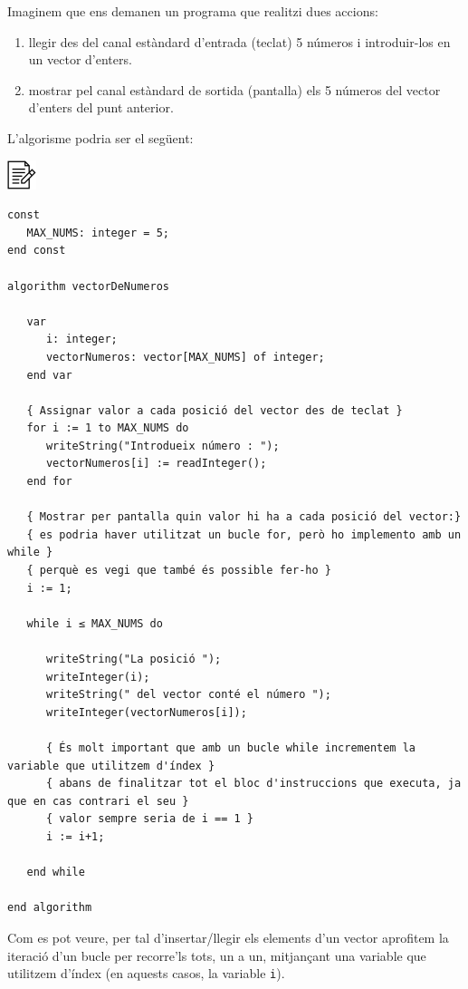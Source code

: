 \documentclass[]{book}
\providecommand{\tightlist}{%
  \setlength{\itemsep}{0pt}\setlength{\parskip}{0pt}}
\begin{document}
Imaginem que ens demanen un programa que realitzi dues accions:

\begin{enumerate}
\def\labelenumi{\arabic{enumi}.}
\tightlist
\item
  llegir des del canal estàndard d'entrada (teclat) 5 números i
  introduir-los en un vector d'enters.
\item
  mostrar pel canal estàndard de sortida (pantalla) els 5 números del
  vector d'enters del punt anterior.
\end{enumerate}

L'algorisme podria ser el següent:

\includegraphics{./img/alg.png}

\begin{verbatim}
const
   MAX_NUMS: integer = 5;
end const

algorithm vectorDeNumeros

   var
      i: integer;
      vectorNumeros: vector[MAX_NUMS] of integer;
   end var

   { Assignar valor a cada posició del vector des de teclat }
   for i := 1 to MAX_NUMS do
      writeString("Introdueix número : ");
      vectorNumeros[i] := readInteger();
   end for

   { Mostrar per pantalla quin valor hi ha a cada posició del vector:}
   { es podria haver utilitzat un bucle for, però ho implemento amb un while }
   { perquè es vegi que també és possible fer-ho }
   i := 1;

   while i ≤ MAX_NUMS do

      writeString("La posició ");
      writeInteger(i);
      writeString(" del vector conté el número ");
      writeInteger(vectorNumeros[i]);

      { És molt important que amb un bucle while incrementem la variable que utilitzem d'índex }
      { abans de finalitzar tot el bloc d'instruccions que executa, ja que en cas contrari el seu }
      { valor sempre seria de i == 1 }
      i := i+1;

   end while

end algorithm
\end{verbatim}

Com es pot veure, per tal d'insertar/llegir els elements d'un vector
aprofitem la iteració d'un bucle per recorre'ls tots, un a un,
mitjançant una variable que utilitzem d'índex (en aquests casos, la
variable \texttt{i}).
\end{document}

